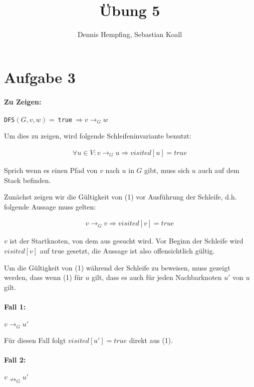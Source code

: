 \documentclass[12pt]{scrartcl}%
\theoremstyle{nonumberplain}
\newcommand{\code}[1]{\lstinline[basicstyle=\ttfamily\color{black}]{#1}}
\begin{document}
\author{Dennis Hempfing, Sebastian Koall}
\title{Übung 5}
\date{} 
\pagestyle{myheadings}

\maketitle %

\section*{Aufgabe 3}

\paragraph{Zu Zeigen:}
\code{DFS}$(G,v,w) = \ $\code{true}$ \ \Rightarrow v \rightarrow_G w$

Um dies zu zeigen, wird folgende Schleifeninvariante benutzt:

\begin{align}
	\forall u \in V: v \rightarrow_G u \Rightarrow visited[u] = true
\end{align}

Sprich wenn es einen Pfad von $v$ nach $u$ in $G$ gibt, muss sich $u$ auch auf dem Stack befinden. 

Zunächst zeigen wir die Gültigkeit von (1) vor Ausführung der Schleife, d.h. folgende Aussage muss gelten:

\begin{align*}
	v \rightarrow_G v \Rightarrow visited[v] = true
\end{align*}

$v$ ist der Startknoten, von dem aus gesucht wird. Vor Beginn der Schleife wird $visited[v]$ auf true gesetzt, die Aussage ist also offensichtlich gültig.

Um die Gültigkeit von (1) während der Schleife zu beweisen, muss gezeigt werden, dass wenn (1) für $u$ gilt, dass es auch für jeden Nachbarknoten $u'$ von $u$ gilt.

\paragraph{Fall 1:} $v \rightarrow_G u'$

Für diesen Fall folgt $visited[u'] = true$ direkt aus (1).

\paragraph{Fall 2:} $v \nrightarrow_G u'$
\end{document}

